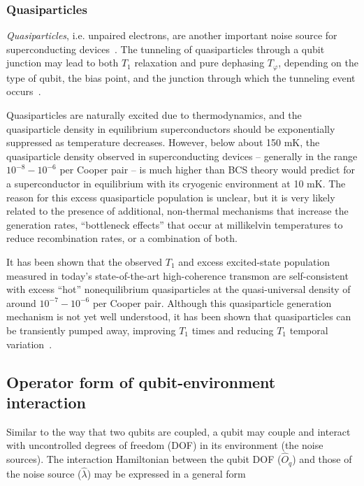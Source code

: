 \documentclass[aip,apr,twocolumn,showpacs,superscriptaddress,groupedaddress,nofootinbib,reprint]{revtex4-1}  %
\begin{document}
\subsubsection{Quasiparticles}

\textit{Quasiparticles}, i.e. unpaired electrons, are another important noise source for superconducting devices~\cite{Catelani2012}. The tunneling of quasiparticles through a qubit junction may lead to both $T_1$ relaxation and pure dephasing $T_{\varphi}$, depending on the type of qubit, the bias point, and the junction through which the tunneling event occurs~\cite{Catelani2011,Gustavsson2016}.

Quasiparticles are naturally excited due to thermodynamics, and the quasiparticle density in equilibrium superconductors should be exponentially suppressed as temperature decreases. However, below about 150 mK, the quasiparticle density observed in superconducting devices -- generally in the range $10^{-8}-10^{-6}$ per Cooper pair -- is much higher than BCS theory would predict for a superconductor in equilibrium with its cryogenic environment at 10 mK. The reason for this excess quasiparticle population is unclear, but it is very likely related to the presence of additional, non-thermal mechanisms that increase the generation rates, ``bottleneck effects'' that occur at millikelvin temperatures to reduce recombination rates, or a combination of both.

It has been shown that the observed $T_1$ and excess excited-state population measured in today's state-of-the-art high-coherence transmon are self-consistent with excess ``hot'' nonequilibrium quasiparticles at the quasi-universal density of around $10^{-7}-10^{-6}$ per Cooper pair\cite{Jin2015,Serniak2018}. Although this quasiparticle generation mechanism is not yet well understood, it has been shown that quasiparticles can be transiently pumped away, improving $T_1$ times and reducing $T_1$ temporal variation~\cite{Gustavsson2016}.

\subsection{Operator form of qubit-environment interaction}

Similar to the way that two qubits are coupled, a qubit may couple and interact with uncontrolled degrees of freedom (DOF) in its environment (the noise sources). The interaction Hamiltonian between the qubit DOF ($\hat{O}_q$) and those of the noise source ($\hat{\lambda}$) may be expressed in a general form
\end{document}
